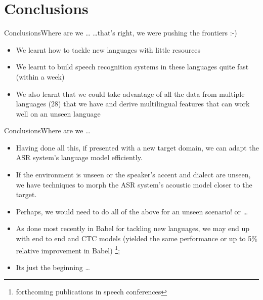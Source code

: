 \documentclass[12pt,xcolor=dvipsnames]{beamer}
\begin{document}
\section{Conclusions}
\begin{frame}{Conclusions}{Where are we \ldots}
 \ldots that's right, we were pushing the frontiers :-)
    \begin{itemize}
    \item  We learnt how to tackle new languages with little resources
    \item  We learnt to build speech recognition systems in these languages quite fast (within a week)
    \item  We also learnt that we could  take advantage of all the data from multiple languages (28) that we have and derive multilingual features that can work well on an unseen language
    \end{itemize}
\end{frame}

\begin{frame}{Conclusions}{Where are we \ldots}
    \begin{itemize}
    \item  Having done all this, if presented with a new target domain, we can adapt the ASR system's language model efficiently.
    \item  If the environment is unseen or the speaker's accent and dialect are unseen, we have techniques to morph the ASR system's acoustic model closer to the target.
    \item  Perhaps, we would need to do all of the above for an unseen scenario!  or \ldots
    \item As done most recently in Babel for tackling new languages, we may end up with end to end and CTC models (yielded the same performance or up to 5\% relative improvement in Babel) \footnote{forthcoming publications in speech conferences}; 
    \item Its just the beginning  \ldots
    \end{itemize}
\end{frame}
\end{document}
